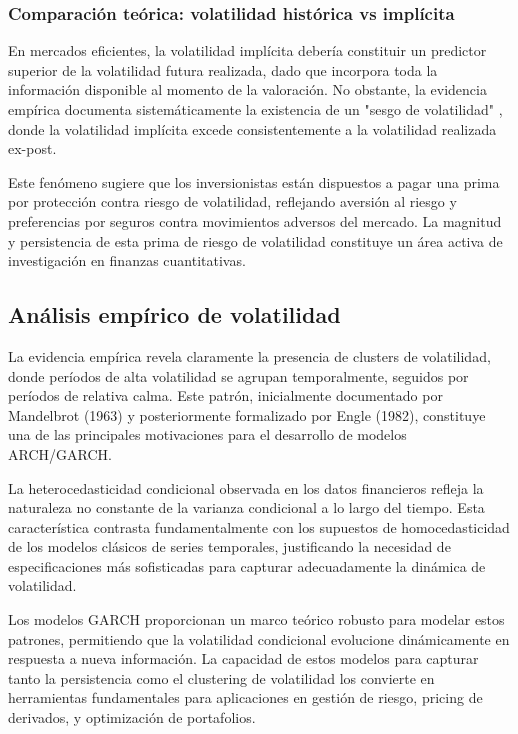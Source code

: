 \subsubsection{Comparación teórica: volatilidad histórica vs implícita}

En mercados eficientes, la volatilidad implícita debería constituir un predictor superior de la volatilidad futura realizada, dado que incorpora toda la información disponible al momento de la valoración. No obstante, la evidencia empírica documenta sistemáticamente la existencia de un "sesgo de volatilidad" , donde la volatilidad implícita excede consistentemente a la volatilidad realizada ex-post.
\newline

Este fenómeno sugiere que los inversionistas están dispuestos a pagar una prima por protección contra riesgo de volatilidad, reflejando aversión al riesgo y preferencias por seguros contra movimientos adversos del mercado. La magnitud y persistencia de esta prima de riesgo de volatilidad constituye un área activa de investigación en finanzas cuantitativas.

\subsection{Análisis empírico de volatilidad}

La evidencia empírica revela claramente la presencia de clusters de volatilidad, donde períodos de alta volatilidad se agrupan temporalmente, seguidos por períodos de relativa calma. Este patrón, inicialmente documentado por Mandelbrot (1963) y posteriormente formalizado por Engle (1982), constituye una de las principales motivaciones para el desarrollo de modelos ARCH/GARCH.
\newline

La heterocedasticidad condicional observada en los datos financieros refleja la naturaleza no constante de la varianza condicional a lo largo del tiempo. Esta característica contrasta fundamentalmente con los supuestos de homocedasticidad de los modelos clásicos de series temporales, justificando la necesidad de especificaciones más sofisticadas para capturar adecuadamente la dinámica de volatilidad.

Los modelos GARCH proporcionan un marco teórico robusto para modelar estos patrones, permitiendo que la volatilidad condicional evolucione dinámicamente en respuesta a nueva información. La capacidad de estos modelos para capturar tanto la persistencia como el clustering de volatilidad los convierte en herramientas fundamentales para aplicaciones en gestión de riesgo, pricing de derivados, y optimización de portafolios.

